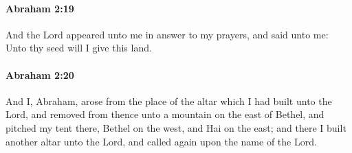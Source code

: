 
		\paragraph{Abraham 2:19} %
			\label{ABRAHAM-2-19}

			And the Lord appeared unto me in answer to my prayers, and said unto me: Unto thy seed will I give this land.


		\paragraph{Abraham 2:20} %
			\label{ABRAHAM-2-20}

			And I, Abraham, arose from the place of the altar which I had built unto the Lord, and removed from thence unto a mountain on the east of Bethel, and pitched my tent there, Bethel on the west, and Hai on the east; and there I built another altar unto the Lord, and called again upon the name of the Lord.

